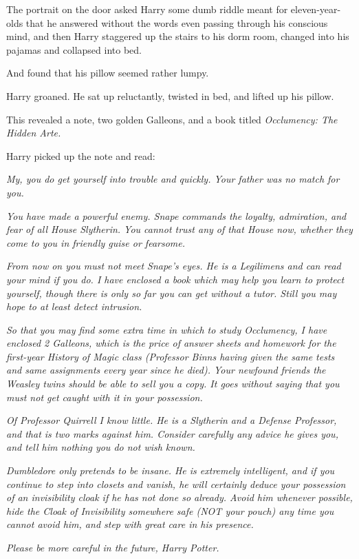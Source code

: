 The portrait on the door asked Harry some dumb riddle meant for
eleven-year-olds that he answered without the words even passing through
his conscious mind, and then Harry staggered up the stairs to his dorm
room, changed into his pajamas and collapsed into bed.

And found that his pillow seemed rather lumpy.

Harry groaned. He sat up reluctantly, twisted in bed, and lifted up his
pillow.

This revealed a note, two golden Galleons, and a book titled
\emph{Occlumency: The Hidden Arte.}

Harry picked up the note and read:

\emph{My, you do get yourself into trouble and quickly. Your father was
no match for you.}

\emph{You have made a powerful enemy. Snape commands the loyalty,
admiration, and fear of all House Slytherin. You cannot trust any of
that House now, whether they come to you in friendly guise or fearsome.}

\emph{From now on you must not meet Snape's eyes. He is a Legilimens and
can read your mind if you do. I have enclosed a book which may help you
learn to protect yourself, though there is only so far you can get
without a tutor. Still you may hope to at least detect intrusion.}

\emph{So that you may find some extra time in which to study Occlumency,
I have enclosed 2 Galleons, which is the price of answer sheets and
homework for the first-year History of Magic class (Professor Binns
having given the same tests and same assignments every year since he
died). Your newfound friends the Weasley twins should be able to sell
you a copy. It goes without saying that you must not get caught with it
in your possession.}

\emph{Of Professor Quirrell I know little. He is a Slytherin and a
Defense Professor, and that is two marks against him. Consider carefully
any advice he gives you, and tell him nothing you do not wish known.}

\emph{Dumbledore only pretends to be insane. He is extremely
intelligent, and if you continue to step into closets and vanish, he
will certainly deduce your possession of an invisibility cloak if he has
not done so already. Avoid him whenever possible, hide the Cloak of
Invisibility somewhere safe (NOT your pouch) any time you cannot avoid
him, and step with great care in his presence.}

\emph{Please be more careful in the future, Harry Potter.}

